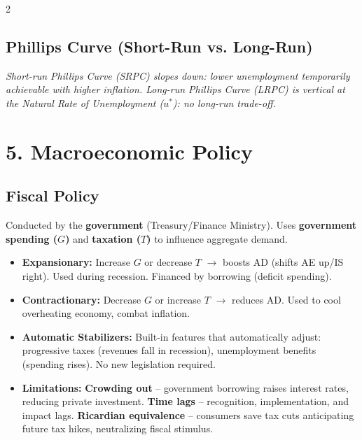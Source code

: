 \documentclass[10pt,a4paper]{article}
\begin{document}
\begin{multicols}{2}
\subsection*{Phillips Curve (Short-Run vs. Long-Run)}
\begin{center}
\end{center}
\textit{Short-run Phillips Curve (SRPC) slopes down: lower unemployment temporarily achievable with higher inflation. Long-run Phillips Curve (LRPC) is vertical at the Natural Rate of Unemployment ($u^*$): no long-run trade-off.}

\section*{5. Macroeconomic Policy}

\subsection*{Fiscal Policy}
Conducted by the \textbf{government} (Treasury/Finance Ministry). Uses \textbf{government spending ($G$)} and \textbf{taxation ($T$)} to influence aggregate demand.
\begin{itemize}[leftmargin=*,nosep]
    \item \textbf{Expansionary:} Increase $G$ or decrease $T$ $\to$ boosts AD (shifts AE up/IS right). Used during recession. Financed by borrowing (deficit spending).
    \item \textbf{Contractionary:} Decrease $G$ or increase $T$ $\to$ reduces AD. Used to cool overheating economy, combat inflation.
    \item \textbf{Automatic Stabilizers:} Built-in features that automatically adjust: progressive taxes (revenues fall in recession), unemployment benefits (spending rises). No new legislation required.
    \item \textbf{Limitations:} \textbf{Crowding out} -- government borrowing raises interest rates, reducing private investment. \textbf{Time lags} -- recognition, implementation, and impact lags. \textbf{Ricardian equivalence} -- consumers save tax cuts anticipating future tax hikes, neutralizing fiscal stimulus.
\end{itemize}


\end{multicols}
\end{document}
